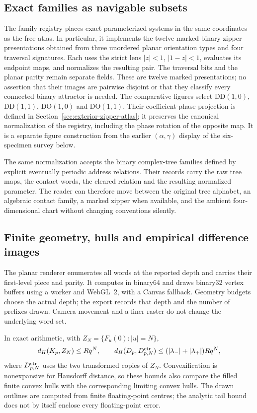 \subsection{Exact families as navigable subsets}
The family registry places exact parameterized systems in the same coordinates
as the free atlas. In particular, it implements the twelve marked binary
zipper presentations obtained from three unordered planar orientation types
and four traversal signatures. Each uses the strict lens
$|z|<1$, $|1-z|<1$, evaluates its endpoint maps, and normalizes the resulting
pair. The traversal bits and the planar parity remain separate fields.
These are twelve marked presentations; no assertion that their images are
pairwise disjoint or that they classify every connected binary attractor is
needed. The comparative figures select DD$(1,0)$, DD$(1,1)$, DO$(1,0)$
and DO$(1,1)$. Their coefficient-phase projection is defined in
Section~\ref{sec:exterior-zipper-atlas}; it preserves the canonical
normalization of the registry, including the phase rotation of the
opposite map. It is a separate figure construction from the earlier
$(\alpha,\gamma)$ display of the six-specimen survey below.

The same normalization accepts the binary complex-tree families defined by
explicit eventually periodic address relations. Their records carry the raw
tree maps, the contact words, the cleared relation and the resulting normalized
parameter. The reader can therefore move between the original tree alphabet,
an algebraic contact family, a marked zipper when available, and the ambient
four-dimensional chart without changing conventions silently.

\subsection{Finite geometry, hulls and empirical difference images}
The planar renderer enumerates all words at the reported depth and carries their
first-level piece and parity. It computes in binary64 and draws binary32 vertex
buffers using a worker and WebGL~2, with a Canvas fallback. Geometry budgets
choose the actual depth; the export records that depth and the number of
prefixes drawn. Camera movement and a finer raster do not change the underlying
word set.

In exact arithmetic, with $Z_N=\{F_u(0):|u|=N\}$,
\begin{equation}\label{eq:atlas-finite-geometry-error}
 d_H(K_p,Z_N)\leq Rq^N,
 \qquad
 d_H(D_p,D_{p,N}^{\rm ctr})\leq
 (|\lambda_-|+|\lambda_+|)Rq^N,
\end{equation}
where $D_{p,N}^{\rm ctr}$ uses the two transformed copies of $Z_N$. Convexification is
nonexpansive for Hausdorff distance, so these bounds also compare the filled
finite convex hulls with the corresponding limiting convex hulls. The drawn
outlines are computed from finite floating-point centres; the analytic tail
bound does not by itself enclose every floating-point error.

